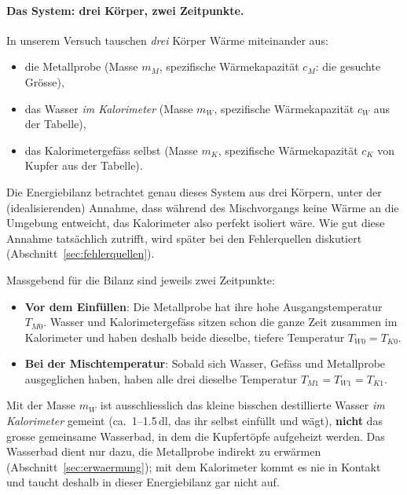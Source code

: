 \documentclass[11pt,a4paper]{article}
\newcommand{\Temp}{T}
\begin{document}
\paragraph{Das System: drei K\"orper, zwei Zeitpunkte.}
In unserem Versuch tauschen \emph{drei} K\"orper W\"arme miteinander aus:
\begin{itemize}
  \item die Metallprobe (Masse $m_M$, spezifische W\"armekapazit\"at $c_M$: die gesuchte Gr\"osse),
  \item das Wasser \emph{im Kalorimeter} (Masse $m_W$, spezifische W\"armekapazit\"at $c_W$ aus der Tabelle),
  \item das Kalorimetergef\"ass selbst (Masse $m_K$, spezifische W\"armekapazit\"at $c_K$ von Kupfer aus der Tabelle).
\end{itemize}
Die Energiebilanz betrachtet genau dieses System aus drei K\"orpern, unter der (idealisierenden) Annahme, dass w\"ahrend des Mischvorgangs keine W\"arme an die Umgebung entweicht, das Kalorimeter also perfekt isoliert w\"are. Wie gut diese Annahme tats\"achlich zutrifft, wird sp\"ater bei den Fehlerquellen diskutiert (Abschnitt~\ref{sec:fehlerquellen}).

Massgebend f\"ur die Bilanz sind jeweils zwei Zeitpunkte:
\begin{itemize}
  \item \textbf{Vor dem Einf\"ullen}: Die Metallprobe hat ihre hohe Ausgangstemperatur $\Temp_{M0}$. Wasser und Kalorimetergef\"ass sitzen schon die ganze Zeit zusammen im Kalorimeter und haben deshalb beide dieselbe, tiefere Temperatur $\Temp_{W0}=\Temp_{K0}$.
  \item \textbf{Bei der Mischtemperatur}: Sobald sich Wasser, Gef\"ass und Metallprobe ausgeglichen haben, haben alle drei dieselbe Temperatur $\Temp_{M1}=\Temp_{W1}=\Temp_{K1}$.
\end{itemize}

\begin{achtungbox}
Mit der Masse $m_W$ ist ausschliesslich das kleine bisschen destillierte Wasser \emph{im Kalorimeter} gemeint (ca.\ 1--1.5\,dl, das ihr selbst einf\"ullt und w\"agt), \textbf{nicht} das grosse gemeinsame Wasserbad, in dem die Kupfert\"opfe aufgeheizt werden. Das Wasserbad dient nur dazu, die Metallprobe indirekt zu erw\"armen (Abschnitt~\ref{sec:erwaermung}); mit dem Kalorimeter kommt es nie in Kontakt und taucht deshalb in dieser Energiebilanz gar nicht auf.
\end{achtungbox}
\end{document}
